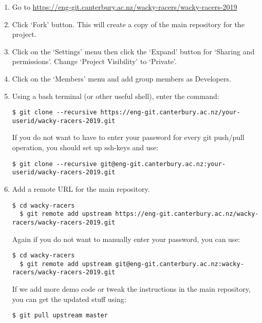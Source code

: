 \documentclass[11pt, a4paper]{article}
\begin{document}
\begin{enumerate}
\item Go to \url{https://eng-git.canterbury.ac.nz/wacky-racers/wacky-racers-2019}

\item Click `Fork' button.  This will create a copy of the main repository for the project.

\item Click on the `Settings' menu then click the `Expand' button for
`Sharing and permissions'.  Change `Project Visibility' to `Private'.

\item Click on the `Members' menu and add group members as Developers.

\item Using a bash terminal (or other useful shell), enter the command:

\begin{lstlisting}[breaklines]
  $ git clone --recursive https://eng-git.canterbury.ac.nz/your-userid/wacky-racers-2019.git  
\end{lstlisting}

If you do not want to have to enter your password for every git
push/pull operation, you should set up ssh-keys and use:

\begin{lstlisting}[breaklines]
  $ git clone --recursive git@eng-git.canterbury.ac.nz:your-userid/wacky-racers-2019.git
\end{lstlisting}

\item Add a remote URL for the main repository.
%
\begin{lstlisting}[breaklines]
  $ cd wacky-racers 
  $ git remote add upstream https://eng-git.canterbury.ac.nz/wacky-racers/wacky-racers-2019.git  
\end{lstlisting}
%
Again if you do not want to manually enter your password, you can use:
%
\begin{lstlisting}[breaklines]
  $ cd wacky-racers 
  $ git remote add upstream git@eng-git.canterbury.ac.nz:wacky-racers/wacky-racers-2019.git    
\end{lstlisting}
%
If we add more demo code or tweak the instructions in the main
repository, you can get the updated stuff using:
%
\begin{lstlisting}[breaklines]
  $ git pull upstream master
\end{lstlisting}
\end{enumerate}
\end{document}
